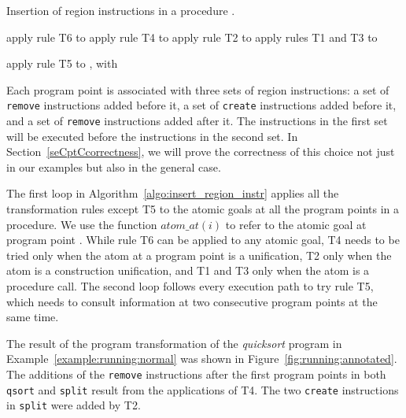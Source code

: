 \documentclass{tlp}
\newcommand{\atomat}[1]{\ensuremath{{atom\_at}(#1)}}
\newcommand{\code}[1]{{\tt#1}}
\begin{document}
\begin{algorithm}
    \small
    \caption{Insertion of region instructions in a procedure .}
    \label{algo:insert_region_instr}
\begin{algorithmic}

    \STATE 
    \STATE apply rule T6 to 
        \IF{}
            \STATE apply rule T4 to 
            \IF{}
                \STATE apply rule T2 to 
            \ENDIF
        \ELSE
            \STATE apply rules T1 and T3 to 
        \ENDIF
    \ENDFOR

            \STATE apply rule T5 to , with 
        \ENDFOR
    \ENDFOR

\end{algorithmic}
\normalsize
\end{algorithm}

Each program point is associated with three sets of region instructions:
a set of \code{remove} instructions added before it,
a set of \code{create} instructions added before it, and
a set of \code{remove} instructions added after it.
The instructions in the first set will be executed
before the instructions in the second set.
In Section~\ref{seCptCcorrectness},
we will prove the correctness of this choice
not just in our examples but also in the general case.

The first loop in Algorithm~\ref{algo:insert_region_instr}
applies all the transformation rules except T5
to the atomic goals at all the program points in a procedure.
We use the function \atomat{i} to refer to
the atomic goal at program point .
While rule T6 can be applied to any atomic goal,
T4 needs to be tried only when the atom at a program point is a unification,
T2 only when the atom is a construction unification, and
T1 and T3 only when the atom is a procedure call.
The second loop follows every execution path to try rule T5,
which needs to consult information at two consecutive program points
at the same time.

The result of the program transformation
of the \emph{quicksort} program in Example~\ref{example:running:normal}
was shown in Figure~\ref{fig:running:annotated}.
The additions of the \code{remove} instructions
after the first program points in both \code{qsort} and \code{split}
result from the applications of T4.
The two \code{create} instructions in \code{split} were added by T2.
\end{document}
